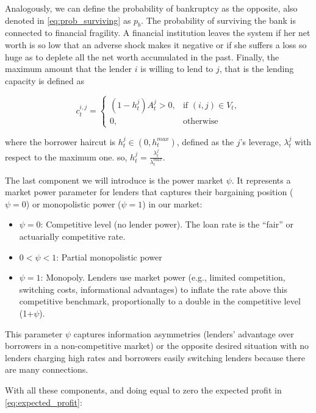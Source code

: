\documentclass{article}
\begin{document}
Analogously, we can define the probability of bankruptcy as the opposite, also denoted in \ref{eq:prob_surviving} as $p_b$. The probability of surviving the bank is connected to financial fragility. A financial institution leaves the system if her net worth is so low that an adverse shock makes it negative or if she suffers a loss
so huge as to deplete all the net worth accumulated in the past. Finally, the maximum amount that the lender $i$ is willing to lend to $j$, that is the lending capacity is defined as

\begin{equation}
c_t^{i,j} = \begin{cases}
(1 - h_t^j) A_t^j > 0, & \text{if } (i,j) \in V_t, \\
0, & \text{otherwise}
\end{cases}
\label{eq:credit_constraint}
\end{equation}

where the borrower haircut is $h^j_t \in (0,h^{max}_t)$, defined as the $j$'s leverage, $\lambda^j_t $ with respect to the maximum one. so, $h^j_t=\frac{\lambda^j_t}{\lambda^{max}_t}$. 

The last component we will introduce is the power market $\psi$. It represents a market power parameter for lenders that captures their bargaining position ($\psi=0$) or monopolistic power ($\psi=1$) in our market:

\begin{itemize}
  \item $\psi = 0$: Competitive level (no lender power). The loan rate is the “fair” or actuarially competitive rate.
  \item $0 < \psi < 1$: Partial monopolistic power
  \item $\psi = 1$: Monopoly. Lenders use market power (e.g., limited competition, switching costs, informational advantages) to inflate the rate above this competitive benchmark, proportionally to a double in the competitive level (1+$\psi$).

\end{itemize}

This parameter $\psi$ captures information asymmetries (lenders' advantage over borrowers in a non-competitive market) or the opposite desired situation with no lenders charging high rates and borrowers easily switching lenders because there are many connections.

With all these components, and doing equal to zero the expected profit in \ref{eq:expected_profit}:
\end{document}
